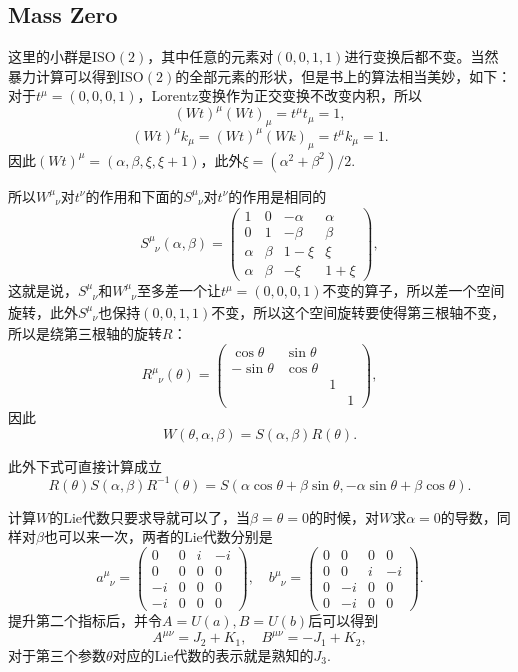 \documentclass[9pt]{extbook}
\begin{document}
\subsection*{Mass Zero}
这里的小群是$\mathrm{ISO}(2)$，其中任意的元素对$(0,0,1,1)$进行变换后都不变。当然暴力计算可以得到$\mathrm{ISO}(2)$的全部元素的形状，但是书上的算法相当美妙，如下：对于$t^\mu=(0,0,0,1)$，Lorentz变换作为正交变换不改变内积，所以
\[
(W t)^\mu (W t)_\mu=t^\mu t_\mu=1,
\]
\[
(W t)^\mu k_\mu=(W t)^\mu (W k)_\mu=t^\mu k_\mu=1.
\]
因此$(Wt)^\mu=(\alpha,\beta,\xi,\xi+1)$，此外$\xi=(\alpha^2+\beta^2)/2$.

所以$W^\mu_{\phantom{\mu}\nu}$对$t^\nu$的作用和下面的$S^\mu_{\phantom{\mu}\nu}$对$t^\nu$的作用是相同的
\[
S^\mu_{\phantom{\mu}\nu}(\alpha,\beta)=
\begin{pmatrix}
1&0&-\alpha&\alpha\\
0&1&-\beta&\beta\\
\alpha&\beta&1-\xi&\xi\\
\alpha&\beta&-\xi&1+\xi
\end{pmatrix},
\]
这就是说，$S^\mu_{\phantom{\mu}\nu}$和$W^\mu_{\phantom{\mu}\nu}$至多差一个让$t^\mu=(0,0,0,1)$不变的算子，所以差一个空间旋转，此外$S^\mu_{\phantom{\mu}\nu}$也保持$(0,0,1,1)$不变，所以这个空间旋转要使得第三根轴不变，所以是绕第三根轴的旋转$R$：
\[
R^\mu_{\phantom{\mu}\nu}(\theta)=
\begin{pmatrix}
\cos\theta&\sin\theta&&\\
-\sin\theta&\cos\theta&&\\
&&1&\\
&&&1
\end{pmatrix},
\]
因此
\[
W(\theta,\alpha,\beta)=S(\alpha,\beta)R(\theta).
\]

此外下式可直接计算成立
\[
R(\theta)S(\alpha,\beta)R^{-1}(\theta)=S(\alpha\cos\theta+\beta\sin\theta,-\alpha\sin\theta+\beta\cos\theta).
\]

计算$W$的Lie代数只要求导就可以了，当$\beta=\theta=0$的时候，对$W$求$\alpha=0$的导数，同样对$\beta$也可以来一次，两者的Lie代数分别是
\[a^\mu_{\phantom{\mu}\nu}=
\begin{pmatrix}
0&0&i&-i\\
0&0&0&0\\
-i&0&0&0\\
-i&0&0&0
\end{pmatrix},\quad
b^\mu_{\phantom{\mu}\nu}=
\begin{pmatrix}
0&0&0&0\\
0&0&i&-i\\
0&-i&0&0\\
0&-i&0&0
\end{pmatrix}.
\]
提升第二个指标后，并令$A=U(a),B=U(b)$后可以得到
\[
A^{\mu\nu}=J_2+K_1,\quad B^{\mu\nu}=-J_1+K_2,
\]
对于第三个参数$\theta$对应的Lie代数的表示就是熟知的$J_3$.
\end{document}
